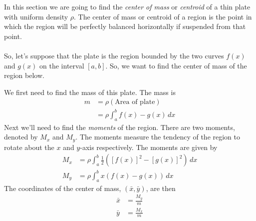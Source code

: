 \documentclass[10pt,reqno]{book}
\theoremstyle{definition}
\begin{document}
	In this section we are going to find the \textit{center of mass} or \textit{centroid} of a thin plate with uniform density $ \rho $. The center of mass or centroid of a region is the point in which the region will be perfectly balanced horizontally if suspended from that point.\\ \\
	So, let's suppose that the plate is the region bounded by the two curves $ f(x) $ and $ g(x) $ on the interval $ [a,b] $. So, we want to find the center of mass of the region below.
	\begin{center}
	\end{center}
	We first need to find the mass of this plate. The mass is
	\begin{align*}
		m &= \rho(\text{Area of plate})\\
		  &= \rho \int_a^b f(x) - g(x)\,dx 
	\end{align*}		
	Next we'll need to find the \textit{moments} of the region. There are two moments, denoted by $ M_x $ and $ M_y $. The moments measure the tendency of the region to rotate about the $ x $ and $ y $-axis respectively. The moments are given by
	\begin{align*}
		M_x &= \rho \int_a^b \frac{1}{2} \left( [f(x)]^2 - [g(x)]^2 \right)\,dx\\
		M_y &= \rho \int_a^b x (f(x) - g(x))\,dx
	\end{align*}
	The coordinates of the center of mass, $ (\bar{x},\bar{y}) $, are then
	\begin{align*}
		\bar{x} &= \frac{M_y}{m}\\
		\bar{y} &= \frac{M_x}{m}
	\end{align*}
	
\end{document}
